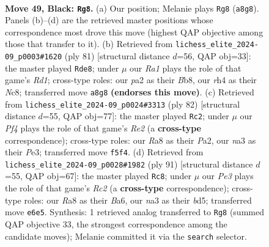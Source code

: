 \documentclass[11pt]{article}
\begin{document}
\clearpage

\begin{figure}[p]\centering
\begin{subfigure}{0.46\textwidth}\centering
\resizebox{\linewidth}{!}{%
\newchessgame
\chessboard[
  setfen={r7/p7/1pr1p1kp/n4p2/2P4R/N1B1PP2/P3K1P1/2R5 b - - 6 49},
  showmover=false,
  pgfstyle=straightmove, color=movearrow, markmove={a8-g8}
]}
\caption{}
\end{subfigure}\hfill
\begin{subfigure}{0.46\textwidth}\centering
\resizebox{\linewidth}{!}{%
\newchessgame
\chessboard[
  setfen={1bnr4/4r3/1P4pk/4pp2/2Np4/3P2P1/6BP/1R2R1K1 b - - 4 41},
  showmover=false,
  pgfstyle=straightmove, color=movearrow, markmove={d8-e8}
]}
\caption{}
\end{subfigure}
\\[4pt]
\begin{subfigure}{0.46\textwidth}\centering
\resizebox{\linewidth}{!}{%
\newchessgame
\chessboard[
  setfen={6k1/4pp2/2pp1bp1/p7/2rPN2P/4PPP1/P3R1K1/8 w - - 0 42},
  showmover=false,
  pgfstyle=straightmove, color=movearrow, markmove={e2-c2}
]}
\caption{}
\end{subfigure}\hfill
\begin{subfigure}{0.46\textwidth}\centering
\resizebox{\linewidth}{!}{%
\newchessgame
\chessboard[
  setfen={8/p1r1r3/bp4pk/2nB3p/3RP2P/P1R1K1N1/6P1/8 b - - 30 46},
  showmover=false,
  pgfstyle=straightmove, color=movearrow, markmove={c7-c8}
]}
\caption{}
\end{subfigure}
\caption{\textbf{Move 49, Black: \texttt{Rg8}.} (a) Our position; Melanie plays \texttt{Rg8} (\texttt{a8g8}). Panels (b)--(d) are the retrieved master positions whose correspondence most drove this move (highest QAP objective among those that transfer to it). (b) Retrieved from \texttt{lichess\_elite\_2024-09\_p0003\#1620} (ply 81) [structural distance $d$=56, QAP obj=33]: the master played \texttt{Rde8}; under $\mu$ our \emph{Ra1} plays the role of that game's \emph{Rd1}; cross-type roles: our \emph{p}a2 as their \emph{B}b8, our \emph{r}h4 as their \emph{N}c8; transferred move \texttt{a8g8} \textbf{(endorses this move)}. (c) Retrieved from \texttt{lichess\_elite\_2024-09\_p0024\#3313} (ply 82) [structural distance $d$=55, QAP obj=77]: the master played \texttt{Rc2}; under $\mu$ our \emph{Pf4} plays the role of that game's \emph{Re2} (a \textbf{cross-type} correspondence); cross-type roles: our \emph{R}a8 as their \emph{P}a2, our \emph{n}a3 as their \emph{P}e3; transferred move \texttt{f5f4}. (d) Retrieved from \texttt{lichess\_elite\_2024-09\_p0028\#1982} (ply 91) [structural distance $d$=55, QAP obj=67]: the master played \texttt{Rc8}; under $\mu$ our \emph{Pe3} plays the role of that game's \emph{Rc2} (a \textbf{cross-type} correspondence); cross-type roles: our \emph{R}a8 as their \emph{B}a6, our \emph{n}a3 as their \emph{b}d5; transferred move \texttt{e6e5}. Synthesis: 1 retrieved analog transferred to \texttt{Rg8} (summed QAP objective 33, the strongest correspondence among the candidate moves); Melanie committed it via the \texttt{search} selector.}
\label{fig:thought-m97}
\end{figure}
\end{document}
